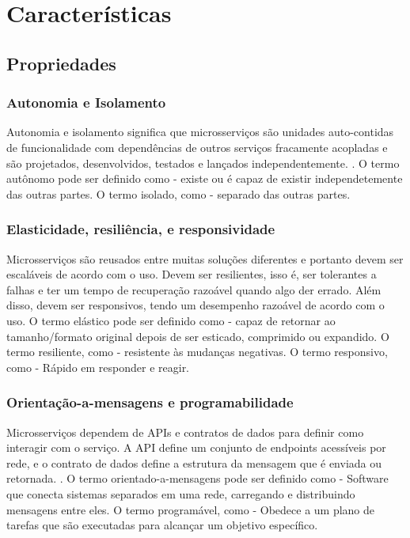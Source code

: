 \chapter{Características}\label{chapter-caracteristicas}


\section{Propriedades}

\subsection{Autonomia e Isolamento}
Autonomia e isolamento significa que microsserviços são unidades auto-contidas de funcionalidade com dependências de outros serviços fracamente acopladas e são projetados, desenvolvidos, testados e lançados independentemente. \cite{Familiar2015}. O termo autônomo pode ser definido como - existe ou é capaz de existir independetemente das outras partes. O termo isolado, como - separado das outras partes.

\subsection{Elasticidade, resiliência, e responsividade}

Microsserviços são reusados entre muitas soluções diferentes e portanto devem ser escaláveis de acordo com o uso. Devem ser resilientes, isso é, ser tolerantes a falhas e ter um tempo de recuperação razoável quando algo der errado. Além disso, devem ser responsivos, tendo um desempenho razoável de acordo com o uso. \cite{Familiar2015} O termo elástico pode ser definido como - capaz de retornar ao tamanho/formato original depois de ser esticado, comprimido ou expandido. O termo resiliente, como - resistente às mudanças negativas. O termo responsivo, como - Rápido em responder e reagir.

\subsection{Orientação-a-mensagens e programabilidade}

Microsserviços dependem de APIs e contratos de dados para definir como interagir com o serviço. A API define um conjunto de endpoints acessíveis por rede, e o contrato de dados define a estrutura da mensagem que é enviada ou retornada. \cite{Familiar2015}. O termo orientado-a-mensagens pode ser definido como - Software que conecta sistemas separados em uma rede, carregando e distribuindo mensagens entre eles. O termo programável, como - Obedece a um plano de tarefas que são executadas para alcançar um objetivo específico.

